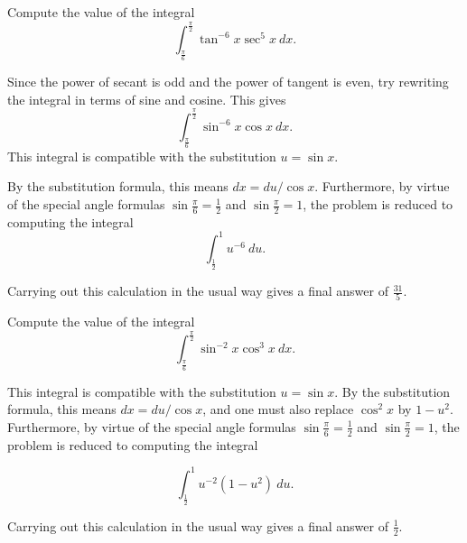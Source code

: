 \documentclass{ximera}
\begin{document}
\begin{question}%

Compute the value of the integral
\[\int_{\frac{\pi}{6}}^{\frac{\pi}{2}} \tan^{-6} x  \sec^{5} x ~dx.\]
\begin{multiplechoice}
\end{multiplechoice}
\begin{feedback}
Since the power of secant is odd and the power of tangent is even, try rewriting the integral in terms of sine and cosine. This gives 
\[\int_{\frac{\pi}{6}}^{\frac{\pi}{2}} \sin^{-6} x  \cos x ~dx.\]
This integral is compatible with the substitution \(u = \sin x\). \begin{hint} By the substitution formula, this means \(dx = du / \cos x\). Furthermore, by virtue of the special angle formulas \(\sin \frac{\pi}{6} = \frac{1}{2}\) and \(\sin \frac{\pi}{2} = 1\), the problem is reduced to computing the integral
\[\int_{\frac{1}{2}}^{1} u^{-6} ~du.\] \begin{hint}
Carrying out this calculation in the usual way gives a final answer of \(\frac{31}{5}\). \end{hint} \end{hint}
\end{feedback}

\end{question}

\begin{question}%

Compute the value of the integral
\[\int_{\frac{\pi}{6}}^{\frac{\pi}{2}} \sin^{-2} x  \cos^{3} x ~dx.\]
\begin{multiplechoice}
\end{multiplechoice}
\begin{feedback}
This integral is compatible with the substitution \(u = \sin x\). By the substitution formula, this means \(dx = du / \cos x\), and one must also replace \(\cos^2 x\) by \(1-u^2\). Furthermore, by virtue of the special angle formulas \(\sin \frac{\pi}{6} = \frac{1}{2}\) and \(\sin \frac{\pi}{2} = 1\), the problem is reduced to computing the integral \begin{hint}
\[\int_{\frac{1}{2}}^{1} u^{-2}(1-u^2) ~du.\] \begin{hint}
Carrying out this calculation in the usual way gives a final answer of \(\frac{1}{2}\). \end{hint} \end{hint}
\end{feedback}

\end{question}
\end{document}
